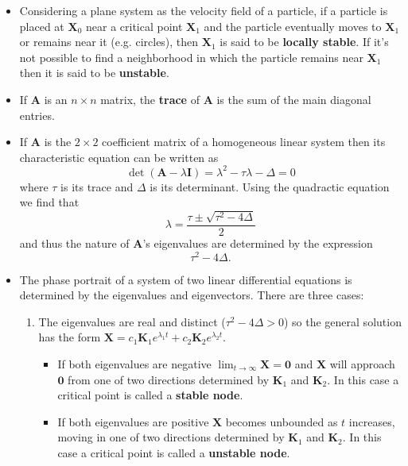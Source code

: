 \documentclass{article}
\begin{document}
\begin{itemize}
  \item Considering a plane system as the velocity field of a particle, if a particle is placed at $\mathbf{X}_0$ near a critical point $\mathbf{X}_1$ and the particle eventually moves to $\mathbf{X}_1$ or remains near it (e.g. circles), then $\mathbf{X}_1$ is said to be \textbf{locally stable}. If it's not possible to find a neighborhood in which the particle remains near $\mathbf{X}_1$ then it is said to be \textbf{unstable}.

  \item If $\mathbf{A}$ is an $n \times n$ matrix, the \textbf{trace} of $\mathbf{A}$ is the sum of the main diagonal entries.

  \item If $\mathbf{A}$ is the $2 \times 2$ coefficient matrix of a homogeneous linear system then its characteristic equation can be written as \[\det (\mathbf{A} - \lambda \mathbf{I}) = \lambda^2 - \tau \lambda - \Delta = 0\] where $\tau$ is its trace and $\Delta$ is its determinant. Using the quadractic equation we find that \[\lambda = \frac{\tau \pm \sqrt{\tau^2 - 4 \Delta}}{2}\] and thus the nature of $\mathbf{A}$'s eigenvalues are determined by the expression \[\tau^2 - 4 \Delta.\]

  \item The phase portrait of a system of two linear differential equations is determined by the eigenvalues and eigenvectors. There are three cases:

        \begin{enumerate}
          \item The eigenvalues are real and distinct ($\tau^2 - 4 \Delta > 0$) so the general solution has the form $\mathbf{X} = c_1 \mathbf{K}_1 e^{\lambda_1 t} + c_2 \mathbf{K}_2 e^{\lambda_2 t}$.

                \begin{itemize}
                  \item If both eigenvalues are negative $\lim_{t \rightarrow \infty} \mathbf{X} = \mathbf{0}$ and $\mathbf{X}$ will approach $\mathbf{0}$ from one of two directions determined by $\mathbf{K}_1$ and $\mathbf{K}_2$. In this case a critical point is called a \textbf{stable node}.

                  \item If both eigenvalues are positive $\mathbf{X}$ becomes unbounded as $t$ increases, moving in one of two directions determined by $\mathbf{K}_1$ and $\mathbf{K}_2$. In this case a critical point is called a \textbf{unstable node}.


\end{itemize}
\end{enumerate}
\end{itemize}
\end{document}
